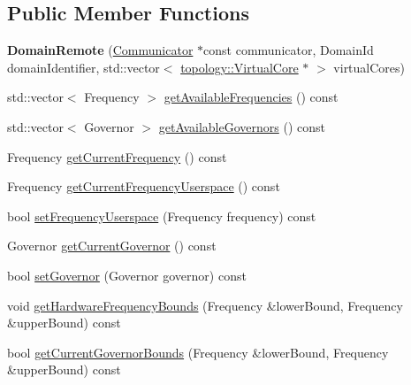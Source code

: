 \subsection*{Public Member Functions}
\begin{DoxyCompactItemize}
\item 
\hypertarget{classmammut_1_1cpufreq_1_1DomainRemote_a29f8a1cf54c6457a7b0fb5b01fbec790}{{\bfseries Domain\-Remote} (\hyperlink{classmammut_1_1Communicator}{Communicator} $\ast$const communicator, Domain\-Id domain\-Identifier, std\-::vector$<$ \hyperlink{classmammut_1_1topology_1_1VirtualCore}{topology\-::\-Virtual\-Core} $\ast$ $>$ virtual\-Cores)}\label{classmammut_1_1cpufreq_1_1DomainRemote_a29f8a1cf54c6457a7b0fb5b01fbec790}

\item 
std\-::vector$<$ Frequency $>$ \hyperlink{classmammut_1_1cpufreq_1_1DomainRemote_a07132aa88d0c49d2f48a01e47604ae39}{get\-Available\-Frequencies} () const 
\item 
std\-::vector$<$ Governor $>$ \hyperlink{classmammut_1_1cpufreq_1_1DomainRemote_a125ba0d251841a14853fb9830564fba8}{get\-Available\-Governors} () const 
\item 
Frequency \hyperlink{classmammut_1_1cpufreq_1_1DomainRemote_a080d7be95c68f1dc57510a1fe4765f65}{get\-Current\-Frequency} () const 
\item 
Frequency \hyperlink{classmammut_1_1cpufreq_1_1DomainRemote_a0202e17b3b2a9ff30b711c5157ec9a86}{get\-Current\-Frequency\-Userspace} () const 
\item 
bool \hyperlink{classmammut_1_1cpufreq_1_1DomainRemote_ad35211bbe0ed2e8bb0f31e0942ec21d2}{set\-Frequency\-Userspace} (Frequency frequency) const 
\item 
Governor \hyperlink{classmammut_1_1cpufreq_1_1DomainRemote_a44628a8aa9d605e683c3273ddbe549b7}{get\-Current\-Governor} () const 
\item 
bool \hyperlink{classmammut_1_1cpufreq_1_1DomainRemote_ab8d851c0880768b373130bdaca889e50}{set\-Governor} (Governor governor) const 
\item 
void \hyperlink{classmammut_1_1cpufreq_1_1DomainRemote_a2343f9e0b325f549062a3df160945ae5}{get\-Hardware\-Frequency\-Bounds} (Frequency \&lower\-Bound, Frequency \&upper\-Bound) const 
\item 
bool \hyperlink{classmammut_1_1cpufreq_1_1DomainRemote_a351e9fc310205750a81417b5d5e278e0}{get\-Current\-Governor\-Bounds} (Frequency \&lower\-Bound, Frequency \&upper\-Bound) const 
\item 

\end{DoxyCompactItemize}
